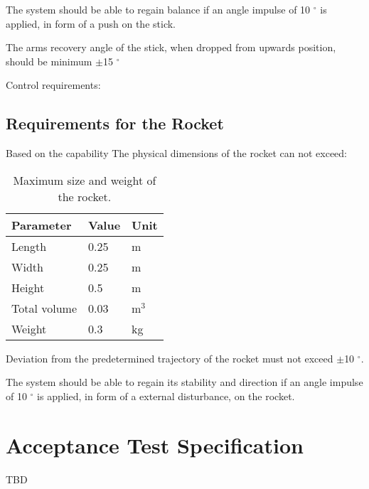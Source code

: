 The system should be able to regain balance if an angle impulse of 10 $^{\circ}$ is applied, in form of a push on the stick.\todo{}  


The arms recovery angle of the stick, when dropped from upwards position, should be minimum $\pm$15 $^{\circ}$ 


Control requirements:



\subsection{Requirements for the Rocket}
Based on the capability 
The physical dimensions of the rocket can not exceed:
\begin{table}[htbp]
\centering
\begin{tabular}{lll}
\hline
Parameter    & Value & Unit  \\ \hline
Length       & 0.25  & m     \\
Width        & 0.25  & m     \\
Height       & 0.5   & m     \\
Total volume & 0.03  & m$^3$ \\
Weight       & 0.3   & kg   
\end{tabular}
\caption{Maximum size and weight of the rocket.}
\label{RocketDimensions}
\end{table}


Deviation from the predetermined trajectory of the rocket must not exceed $\pm$10 $^{\circ}$.


The system should be able to regain its stability and direction if an angle impulse of 10 $^{\circ}$ is applied, in form of a external disturbance, on the rocket.  


\section{Acceptance Test Specification}	
TBD